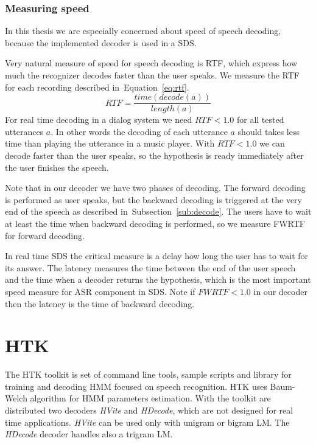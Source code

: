 {\subsubsection*{Measuring speed}
\label{sub:the_metrics_in_speech_recognition}
In this thesis we are especially concerned about speed of speech decoding,
because the implemented decoder is used in a \acl{SDS}.

Very natural measure of speed for speech decoding is \acl{RTF},
which express how much the recognizer decodes faster than the user speaks.
We measure the \ac{RTF} for each recording described in~Equation~\ref{eq:rtf}.
\begin{equation}\label{eq:rtf}
    RTF = \frac{time(decode(a))}{length(a)}
\end{equation}
For real time decoding in a dialog system we need $RTF < 1.0$ for all tested utterances $a$.
In other words the decoding of each utterance $a$ should takes less time than
playing the utterance in a music player.
With $RTF < 1.0$ we can decode faster than the user speaks, 
so the hypothesis is ready immediately after the user finishes the speech. 

Note that in our decoder we have two phases of decoding.
The forward decoding is performed as user speaks, but
the backward decoding is triggered at the very end of the speech
as described in~Subsection~\ref{sub:decode}.
The users have to wait at least the time when backward decoding is performed,
so we measure \ac{FWRTF} for forward decoding.

In real time \ac{SDS} the critical measure is a delay how long the user
has to wait for its answer.
The latency measures the time between the end of the user speech and
the time when a decoder returns the hypothesis, 
which is the most important speed measure for \ac{ASR} component in \ac{SDS}.
Note if $FWRTF < 1.0 $ in our decoder then the latency is the time of backward decoding.


\section{\ac{HTK}}
\label{sec:back_htk}
The \ac{HTK} toolkit is set of command line tools, sample scripts and library
for training and decoding \ac{HMM} focused on speech recognition.
\ac{HTK} uses Baum-Welch algorithm for \ac{HMM} parameters estimation.
With the toolkit are distributed two decoders {\it HVite} and {\it HDecode},
which are not designed for real time applications.
{\it HVite} can be used only with unigram or bigram \ac{LM}. 
The {\it HDecode} decoder handles also a trigram \ac{LM}.

}
